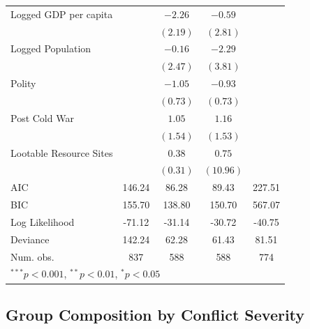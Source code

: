 \documentclass[12pt,]{book}
\let\origtable\table
\let\endorigtable\endtable
\renewenvironment{table}[1][2] {
    \singlespacing
    \expandafter\origtable\expandafter[H]
} {
    \endorigtable
}
\theoremstyle{definition}
\theoremstyle{definition}
\theoremstyle{definition}
\theoremstyle{remark}
\begin{document}
\begin{table}
\begin{center}
\begin{tabular}{l c c c c }
Logged GDP per capita             &               & $-2.26$    & $-0.59$     &             \\
                                  &               & $(2.19)$   & $(2.81)$    &             \\
Logged Population                 &               & $-0.16$    & $-2.29$     &             \\
                                  &               & $(2.47)$   & $(3.81)$    &             \\
Polity                            &               & $-1.05$    & $-0.93$     &             \\
                                  &               & $(0.73)$   & $(0.73)$    &             \\
Post Cold War                     &               & $1.05$     & $1.16$      &             \\
                                  &               & $(1.54)$   & $(1.53)$    &             \\
Lootable Resource Sites           &               & $0.38$     & $0.75$      &             \\
                                  &               & $(0.31)$   & $(10.96)$   &             \\
\hline
AIC                               & 146.24        & 86.28      & 89.43       & 227.51      \\
BIC                               & 155.70        & 138.80     & 150.70      & 567.07      \\
Log Likelihood                    & -71.12        & -31.14     & -30.72      & -40.75      \\
Deviance                          & 142.24        & 62.28      & 61.43       & 81.51       \\
Num. obs.                         & 837           & 588        & 588         & 774         \\
\hline
\multicolumn{5}{l}{\scriptsize{$^{***}p<0.001$, $^{**}p<0.01$, $^*p<0.05$}}
\end{tabular}
\caption{Logit Models of Rebel Group Formation (Secessionist Conflicts Only)}
\label{tab:entry-sec}
\end{center}
\end{table}

\hypertarget{group-composition-by-conflict-severity}{%
\subsection*{Group Composition by Conflict
Severity}\label{group-composition-by-conflict-severity}}
\end{document}
